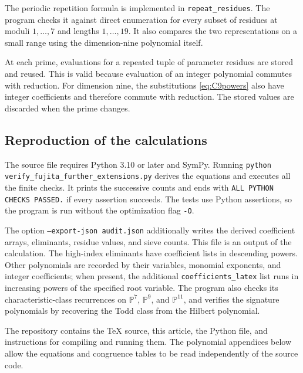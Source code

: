 \documentclass[11pt,reqno,letterpaper]{amsart}
\newcommand{\PP}{\mathbb P}
\theoremstyle{definition}
\numberwithin{equation}{section}
\begin{document}
The periodic repetition formula is implemented in
\nolinkurl{repeat_residues}. The program checks it against direct
enumeration for every subset of residues at moduli $1,\ldots,7$ and
lengths $1,\ldots,19$. It also compares the two representations on a
small range using the dimension-nine polynomial itself.

At each prime, evaluations for a repeated tuple of parameter residues
are stored and reused. This is valid because evaluation of an integer
polynomial commutes with reduction. For dimension nine, the
substitutions \eqref{eq:C9powers} also have integer coefficients and
therefore commute with reduction. The stored values are discarded when
the prime changes.

\subsection{Reproduction of the calculations}

The source file requires Python 3.10 or later and SymPy. Running
\nolinkurl{python verify_fujita_further_extensions.py} derives the
equations and executes all the finite checks. It prints the successive
counts and ends with \texttt{ALL PYTHON CHECKS PASSED.} if every
assertion succeeds. The tests use Python assertions, so the program is
run without the optimization flag \texttt{-O}.

The option \texttt{--export-json audit.json} additionally writes the
derived coefficient arrays, eliminants, residue values, and sieve
counts. This file is an output of the calculation. The high-index
eliminants have coefficient lists in descending powers. Other
polynomials are recorded by their variables, monomial exponents, and
integer coefficients; when present, the additional
\nolinkurl{coefficients_latex} list runs in increasing powers of the
specified root variable. The program also checks its
characteristic-class recurrences on $\PP^7$, $\PP^9$, and $\PP^{11}$,
and verifies the signature polynomials by recovering the Todd class
from the Hilbert polynomial.

The repository contains the TeX source, this article, the Python file,
and instructions for compiling and running them. The polynomial
appendices below allow the equations and congruence tables to be read
independently of the source code.

\appendix

\clearpage
\end{document}
